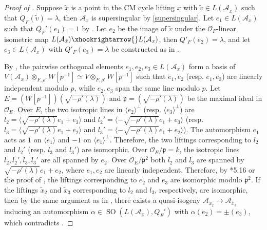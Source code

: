 \documentclass{amsart}
\numberwithin{equation}{subsection}
\numberwithin{theorem}{section}
\theoremstyle{definition}
\theoremstyle{remark}
\newcommand{\cA}{\mathcal{A}}
\newcommand{\cO}{\mathcal{O}}
\DeclareMathOperator{\SO}{SO}
\begin{document}
\begin{proof}[Proof of ]
    Suppose $\tilde{x}$ is a point in the CM cycle lifting $x$ with $\tilde{v}\in L(\cA_{\tilde{x}})$ such that $Q_F(\tilde{v}) = \lambda$, then $\cA_x$ is supersingular by \ref{supersingular}. Let $e_1\in L(\cA_x)$ such that $Q_F'(e_1) = 1$ by . Let $e_2$ be the image of $\tilde{v}$ under the $\cO_F$-linear isometric map $L(\cA_{\tilde{x}})\xhookrightarrow{}L(\cA_x)$, then $Q'_F(e_2) = \lambda$, and let $e_3\in L(\cA_x)$ with $Q'_F(e_3) = \lambda$ be constructed as in .

    
     By , the pairwise orthogonal elements $e_1, e_2, e_3\in L(\mathcal{A}_x)$ form a basis of  $V(\mathcal{A}_x)\otimes_{F, \rho'} W[p^{-1}]\simeq V\otimes_{F, \rho'} W[p^{-1}]$ such that $e_1, e_2$ (resp. $e_1, e_3$) are linearly independent modulo $p$, while $e_2, e_3$ span the same line modulo $p$.  
     Let $E =(W[p^{-1}])(\sqrt{-\rho'(\lambda)})$ and $\mathfrak{p} = (\sqrt{-\rho'(\lambda)})$ be the maximal ideal in $\mathcal{O}_E$. Over $E$, the two isotropic lines in $\langle e_2\rangle ^\perp$ (resp. $\langle e_3\rangle ^{\perp}$) are $l_2 = \langle \sqrt{-\rho'(\lambda)} e_1 +  e_3\rangle$ and $l_2' = \langle -\sqrt{-\rho'(\lambda)} e_1 +  e_3\rangle$ (resp. $l_3 = \langle \sqrt{-\rho'(\lambda)} e_1 +  e_2\rangle$ and $l_3' = \langle -\sqrt{-\rho'(\lambda)} e_1 +  e_2\rangle$). The automorphism $e_1$ acts as $1$ on $\langle e_1\rangle $ and $-1$ on $\langle e_1\rangle ^{\perp}$. Therefore, the two liftings corresponding to $l_2$ and $l_2'$ (resp. $l_3$ and $l_3'$) are isomorphic. Over $\mathcal{O}_E/\mathfrak{p}=k$, the isotropic lines  $l_2, l_2', l_3, l_3'$ are all spanned by $e_2$. Over $\mathcal{O}_E/\mathfrak{p}^2$ both $l_2$ and  $l_3$ are spanned by $\sqrt{-\rho'(\lambda)} e_1 +  e_2$, where $e_1, e_2$ are linearly independent. Therefore, by \cite{MR3484114}*{5.16} or the proof of , the liftings corresponding to $e_2$ and $e_3$ are isomorphic modulo $\mathfrak{p}^2$. If the liftings $\tilde{x}_2$ and $\tilde{x}_3$ corresponding to $l_2$ and $l_3$, respectively, are isomorphic, then by the same argument as in , there exists a quasi-isogeny $\cA_{\tilde{x}_2} \to \cA_{\tilde{x}_3}$ inducing an automorphism $\alpha\in \SO(L(\cA_x), Q_F')$ with $\alpha(e_2) =\pm(e_3)$, which contradicts .


\end{proof}
\end{document}

